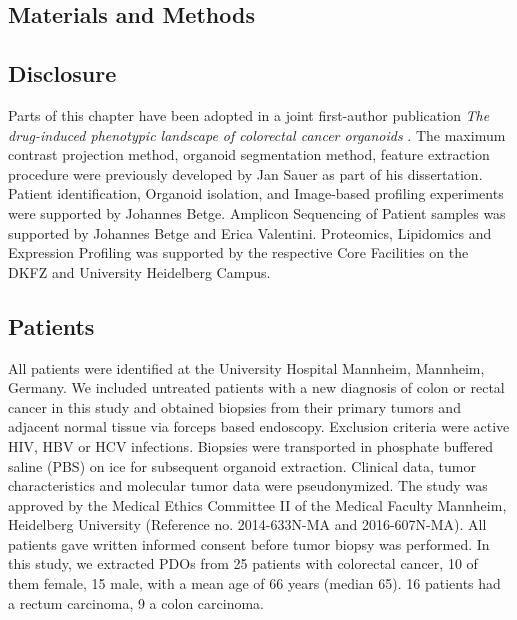 \begin{flushleft}

\chapter{Materials and Methods}

\section{Disclosure}
Parts of this chapter have been adopted in a joint first-author publication \textit{The drug-induced phenotypic landscape of colorectal cancer organoids} \citep{betgeDruginducedPhenotypicLandscape2022}. The maximum contrast projection method, organoid segmentation method, feature extraction procedure were previously developed by Jan Sauer as part of his dissertation. Patient identification, Organoid isolation, and Image-based profiling experiments were supported by Johannes Betge. Amplicon Sequencing of Patient samples was supported by Johannes Betge and Erica Valentini. Proteomics, Lipidomics and Expression Profiling was supported by the respective Core Facilities on the DKFZ and University Heidelberg Campus. 

\section{Patients}
All patients were identified at the University Hospital Mannheim, Mannheim, Germany. We included untreated patients with a new diagnosis of colon or rectal cancer in this study and obtained biopsies from their primary tumors and adjacent normal tissue via forceps based endoscopy. Exclusion criteria were active HIV, HBV or HCV infections. Biopsies were transported in phosphate buffered saline (PBS) on ice for subsequent organoid extraction. Clinical data, tumor characteristics and molecular tumor data were pseudonymized. The study was approved by the Medical Ethics Committee II of the Medical Faculty Mannheim, Heidelberg University (Reference no. 2014-633N-MA and 2016-607N-MA). All patients gave written informed consent before tumor biopsy was performed. In this study, we extracted PDOs from 25 patients with colorectal cancer, 10 of them female, 15 male, with a mean age of 66 years (median 65). 16 patients had a rectum carcinoma, 9 a colon carcinoma.


\end{flushleft}
